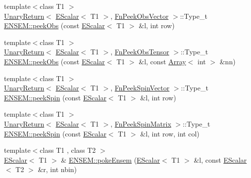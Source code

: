 \begin{DoxyCompactItemize}
\item 
{\footnotesize template$<$class T1 $>$ }\\\mbox{\hyperlink{structENSEM_1_1UnaryReturn}{Unary\+Return}}$<$ \mbox{\hyperlink{classENSEM_1_1EScalar}{E\+Scalar}}$<$ T1 $>$, \mbox{\hyperlink{structENSEM_1_1FnPeekObsVector}{Fn\+Peek\+Obs\+Vector}} $>$\+::Type\+\_\+t \mbox{\hyperlink{group__escalar_ga7b3199ffdfb57391566d3db05e9b38c1}{E\+N\+S\+E\+M\+::peek\+Obs}} (const \mbox{\hyperlink{classENSEM_1_1EScalar}{E\+Scalar}}$<$ T1 $>$ \&l, int row)
\item 
{\footnotesize template$<$class T1 $>$ }\\\mbox{\hyperlink{structENSEM_1_1UnaryReturn}{Unary\+Return}}$<$ \mbox{\hyperlink{classENSEM_1_1EScalar}{E\+Scalar}}$<$ T1 $>$, \mbox{\hyperlink{structENSEM_1_1FnPeekObsTensor}{Fn\+Peek\+Obs\+Tensor}} $>$\+::Type\+\_\+t \mbox{\hyperlink{group__escalar_ga5715083f9573c91b9d4567559f4b2b30}{E\+N\+S\+E\+M\+::peek\+Obs}} (const \mbox{\hyperlink{classENSEM_1_1EScalar}{E\+Scalar}}$<$ T1 $>$ \&l, const \mbox{\hyperlink{classXMLArray_1_1Array}{Array}}$<$ int $>$ \&nn)
\item 
{\footnotesize template$<$class T1 $>$ }\\\mbox{\hyperlink{structENSEM_1_1UnaryReturn}{Unary\+Return}}$<$ \mbox{\hyperlink{classENSEM_1_1EScalar}{E\+Scalar}}$<$ T1 $>$, \mbox{\hyperlink{structENSEM_1_1FnPeekSpinVector}{Fn\+Peek\+Spin\+Vector}} $>$\+::Type\+\_\+t \mbox{\hyperlink{group__escalar_gaa833c21339250a427d537f2c3431f9e2}{E\+N\+S\+E\+M\+::peek\+Spin}} (const \mbox{\hyperlink{classENSEM_1_1EScalar}{E\+Scalar}}$<$ T1 $>$ \&l, int row)
\item 
{\footnotesize template$<$class T1 $>$ }\\\mbox{\hyperlink{structENSEM_1_1UnaryReturn}{Unary\+Return}}$<$ \mbox{\hyperlink{classENSEM_1_1EScalar}{E\+Scalar}}$<$ T1 $>$, \mbox{\hyperlink{structENSEM_1_1FnPeekSpinMatrix}{Fn\+Peek\+Spin\+Matrix}} $>$\+::Type\+\_\+t \mbox{\hyperlink{group__escalar_gadd6441efc37438418dda6c0e5a501f10}{E\+N\+S\+E\+M\+::peek\+Spin}} (const \mbox{\hyperlink{classENSEM_1_1EScalar}{E\+Scalar}}$<$ T1 $>$ \&l, int row, int col)
\item 
{\footnotesize template$<$class T1 , class T2 $>$ }\\\mbox{\hyperlink{classENSEM_1_1EScalar}{E\+Scalar}}$<$ T1 $>$ \& \mbox{\hyperlink{group__escalar_ga9528137f2a0461bf8dc2e6825f00464f}{E\+N\+S\+E\+M\+::poke\+Ensem}} (\mbox{\hyperlink{classENSEM_1_1EScalar}{E\+Scalar}}$<$ T1 $>$ \&l, const \mbox{\hyperlink{classENSEM_1_1EScalar}{E\+Scalar}}$<$ T2 $>$ \&r, int nbin)

\end{DoxyCompactItemize}
